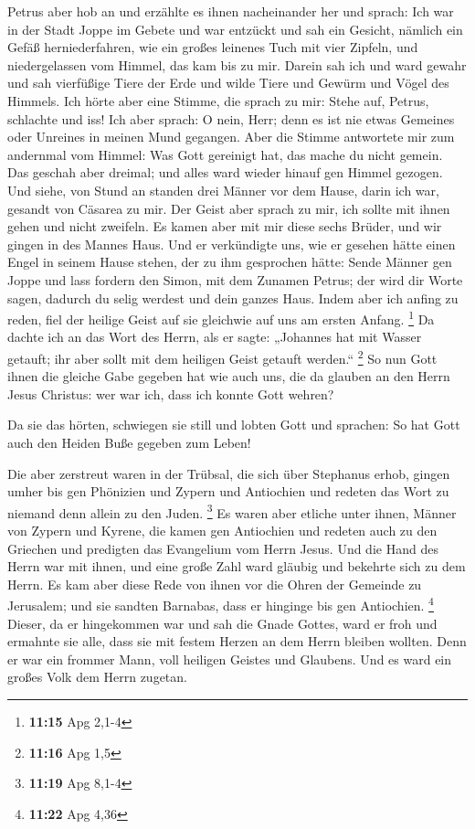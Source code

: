  Petrus aber hob an und erzählte es ihnen nacheinander her
und sprach:  Ich war in der Stadt Joppe im Gebete und war
entzückt und sah ein Gesicht, nämlich ein Gefäß herniederfahren, wie ein
großes leinenes Tuch mit vier Zipfeln, und niedergelassen vom Himmel,
das kam bis zu mir.  Darein sah ich und ward gewahr und sah
vierfüßige Tiere der Erde und wilde Tiere und Gewürm und Vögel des
Himmels.  Ich hörte aber eine Stimme, die sprach zu mir:
Stehe auf, Petrus, schlachte und iss!  Ich aber sprach: O
nein, Herr; denn es ist nie etwas Gemeines oder Unreines in meinen Mund
gegangen.  Aber die Stimme antwortete mir zum andernmal vom
Himmel: Was Gott gereinigt hat, das mache du nicht gemein. 
Das geschah aber dreimal; und alles ward wieder hinauf gen Himmel
gezogen.  Und siehe, von Stund an standen drei Männer vor
dem Hause, darin ich war, gesandt von Cäsarea zu mir.  Der
Geist aber sprach zu mir, ich sollte mit ihnen gehen und nicht zweifeln.
Es kamen aber mit mir diese sechs Brüder, und wir gingen in des Mannes
Haus.  Und er verkündigte uns, wie er gesehen hätte einen
Engel in seinem Hause stehen, der zu ihm gesprochen hätte: Sende Männer
gen Joppe und lass fordern den Simon, mit dem Zunamen Petrus;
 der wird dir Worte sagen, dadurch du selig werdest und
dein ganzes Haus.  Indem aber ich anfing zu reden, fiel der
heilige Geist auf sie gleichwie auf uns am ersten Anfang. \footnote{\textbf{11:15}
  Apg 2,1-4}  Da dachte ich an das Wort des Herrn, als er
sagte: „Johannes hat mit Wasser getauft; ihr aber sollt mit dem heiligen
Geist getauft werden.`` \footnote{\textbf{11:16} Apg 1,5} 
So nun Gott ihnen die gleiche Gabe gegeben hat wie auch uns, die da
glauben an den Herrn Jesus Christus: wer war ich, dass ich konnte Gott
wehren?

 Da sie das hörten, schwiegen sie still und lobten Gott und
sprachen: So hat Gott auch den Heiden Buße gegeben zum Leben!

 Die aber zerstreut waren in der Trübsal, die sich über
Stephanus erhob, gingen umher bis gen Phönizien und Zypern und
Antiochien und redeten das Wort zu niemand denn allein zu den Juden.
\footnote{\textbf{11:19} Apg 8,1-4}  Es waren aber etliche
unter ihnen, Männer von Zypern und Kyrene, die kamen gen Antiochien und
redeten auch zu den Griechen und predigten das Evangelium vom Herrn
Jesus.  Und die Hand des Herrn war mit ihnen, und eine
große Zahl ward gläubig und bekehrte sich zu dem Herrn.  Es
kam aber diese Rede von ihnen vor die Ohren der Gemeinde zu Jerusalem;
und sie sandten Barnabas, dass er hinginge bis gen Antiochien.
\footnote{\textbf{11:22} Apg 4,36}  Dieser, da er
hingekommen war und sah die Gnade Gottes, ward er froh und ermahnte sie
alle, dass sie mit festem Herzen an dem Herrn bleiben wollten.
 Denn er war ein frommer Mann, voll heiligen Geistes und
Glaubens. Und es ward ein großes Volk dem Herrn zugetan.

